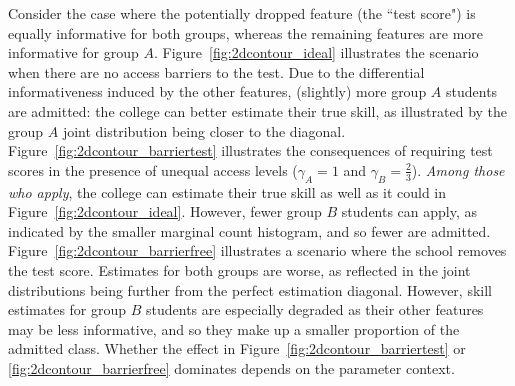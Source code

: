Consider the case where the potentially dropped feature (the ``test score") is equally informative for both groups, whereas the remaining features are more informative for group $A$.
%
Figure~\ref{fig:2dcontour_ideal} illustrates the scenario when there are no access barriers to the test.  Due to the differential informativeness induced by the other features, (slightly) more group $A$ students are admitted: the college can better estimate their true skill, as illustrated by the group $A$ joint distribution being closer to the diagonal.
 Figure~\ref{fig:2dcontour_barriertest} illustrates the consequences of requiring test scores in the presence of unequal access levels ($\gamma_A=1$ and $\gamma_B=\frac{2}{3}$). \textit{Among those who apply}, the college can estimate their true skill as well as it could in Figure~\ref{fig:2dcontour_ideal}. However, fewer group $B$ students can apply, as indicated by the smaller marginal count histogram, and so fewer are admitted.
%
Figure~\ref{fig:2dcontour_barrierfree} illustrates a scenario where the school removes the test score. Estimates for both groups are worse, as reflected in the joint distributions being further from the perfect estimation diagonal. However, skill estimates for group $B$ students are especially degraded as their other features may be less informative, and so they make up a smaller proportion of the admitted class. Whether the effect in Figure~\ref{fig:2dcontour_barriertest} or \ref{fig:2dcontour_barrierfree} dominates depends on the parameter context.
